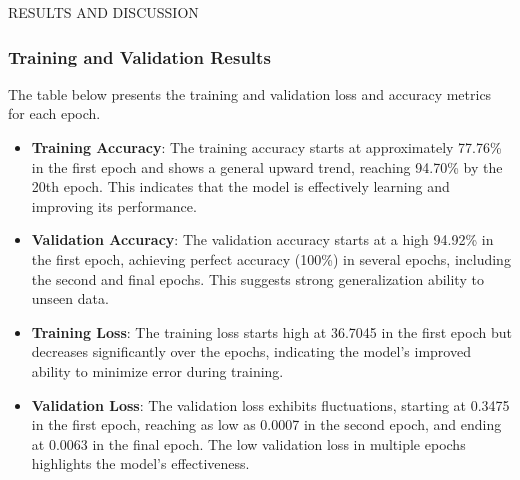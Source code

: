 \begin{section}[]{\uppercase{Results and Discussion}}
\subsubsection{Training and Validation Results}

The table below presents the training and validation loss and accuracy metrics for each epoch.
\begin{itemize}
    \item \textbf{Training Accuracy}: The training accuracy starts at approximately 77.76\% in the first epoch and shows a general upward trend, reaching 94.70\% by the 20th epoch. This indicates that the model is effectively learning and improving its performance.
    \item \textbf{Validation Accuracy}: The validation accuracy starts at a high 94.92\% in the first epoch, achieving perfect accuracy (100\%) in several epochs, including the second and final epochs. This suggests strong generalization ability to unseen data.
    \item \textbf{Training Loss}: The training loss starts high at 36.7045 in the first epoch but decreases significantly over the epochs, indicating the model's improved ability to minimize error during training.
    \item \textbf{Validation Loss}: The validation loss exhibits fluctuations, starting at 0.3475 in the first epoch, reaching as low as 0.0007 in the second epoch, and ending at 0.0063 in the final epoch. The low validation loss in multiple epochs highlights the model's effectiveness.
\end{itemize}


\end{section}
